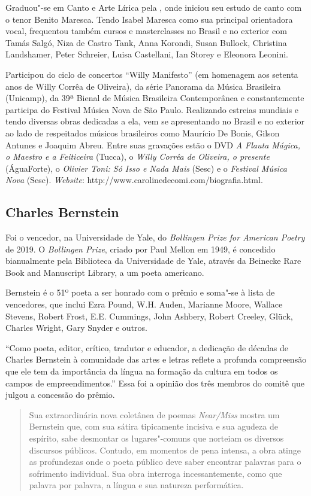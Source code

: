 Graduou"-se em
Canto e Arte Lírica pela , onde iniciou seu estudo de canto com o
tenor Benito Maresca. Tendo Isabel Maresca como sua principal
orientadora vocal, frequentou também cursos e masterclasses no Brasil e
no exterior com Tamás Salgó, Niza de Castro Tank, Anna Korondi, Susan
Bullock, Christina Landshamer, Peter Schreier, Luisa Castellani, Ian
Storey e Eleonora Leonini.

Participou do ciclo de concertos ``Willy Manifesto'' (em homenagem aos
setenta anos de Willy Corrêa de Oliveira), da série Panorama da Música
Brasileira (Unicamp), da 39ª Bienal de Música Brasileira Contemporânea e
constantemente participa do Festival Música Nova de São Paulo.
Realizando estreias mundiais e tendo diversas obras dedicadas a ela, vem
se apresentando no Brasil e no exterior ao lado de respeitados músicos
brasileiros como Maurício De Bonis, Gilson Antunes e Joaquim Abreu.
Entre suas gravações estão o DVD \emph{A Flauta Mágica, o Maestro e a
Feiticeira} (Tucca), o  \emph{Willy Corrêa de Oliveira, o presente}
(ÁguaForte), o  \emph{Olivier Toni: Só Isso e Nada Mais} (Sesc) e o 
\emph{Festival Música Nova} (Sesc). \emph{Website}:
http://www.carolinedecomi.com/biografia.html.

\subsection{Charles Bernstein}

Foi o vencedor, na Universidade de Yale, do
\emph{Bollingen Prize for
American Poetry} de 2019. O \emph{Bollingen Prize}, criado por Paul
Mellon em 1949, é concedido bianualmente pela Biblioteca da Universidade
de Yale, através da Beinecke Rare Book and Manuscript Library, a um
poeta americano.

Bernstein é o 51º poeta a ser honrado com o prêmio e
soma"-se à lista de vencedores, que inclui Ezra Pound, W.H. Auden,
Marianne Moore, Wallace Stevens, Robert Frost, E.E. Cummings, John
Ashbery, Robert Creeley, Glück, Charles Wright, Gary Snyder e outros.

``Como poeta, editor, crítico, tradutor e educador, a dedicação de
décadas de Charles Bernstein à comunidade das artes e letras reflete a
profunda compreensão que ele tem da importância da língua na formação da
cultura em todos os campos de empreendimentos.'' Essa foi a opinião dos
três membros do comitê que julgou a concessão do prêmio.

\begin{quote}
Sua extraordinária nova coletânea de poemas \emph{Near/Miss} mostra um
Bernstein que, com sua sátira tipicamente incisiva e sua agudeza de
espírito, sabe desmontar os lugares"-comuns que norteiam os diversos
discursos públicos. Contudo, em momentos de pena intensa, a obra atinge
as profundezas onde o poeta público deve saber encontrar palavras para o
sofrimento individual. Sua obra interroga incessantemente, como que
palavra por palavra, a língua e sua natureza performática.
\end{quote}

